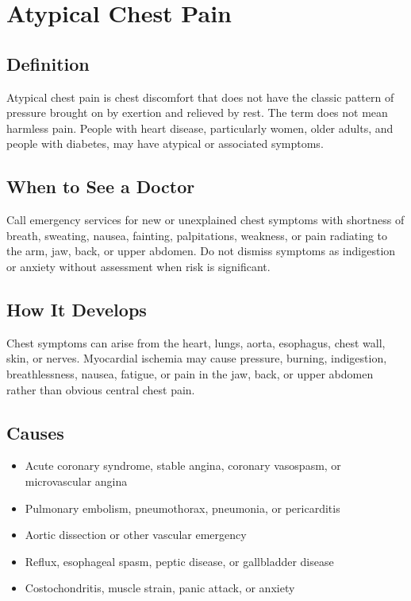 \chapter{Atypical Chest Pain}

\section*{Definition}
Atypical chest pain is chest discomfort that does not have the classic pattern of pressure brought on by exertion and relieved by rest. The term does not mean harmless pain. People with heart disease, particularly women, older adults, and people with diabetes, may have atypical or associated symptoms.

\section*{When to See a Doctor}
Call emergency services for new or unexplained chest symptoms with shortness of breath, sweating, nausea, fainting, palpitations, weakness, or pain radiating to the arm, jaw, back, or upper abdomen. Do not dismiss symptoms as indigestion or anxiety without assessment when risk is significant.

\section*{How It Develops}
Chest symptoms can arise from the heart, lungs, aorta, esophagus, chest wall, skin, or nerves. Myocardial ischemia may cause pressure, burning, indigestion, breathlessness, nausea, fatigue, or pain in the jaw, back, or upper abdomen rather than obvious central chest pain.

\section*{Causes}
\begin{itemize}
  \item Acute coronary syndrome, stable angina, coronary vasospasm, or microvascular angina
  \item Pulmonary embolism, pneumothorax, pneumonia, or pericarditis
  \item Aortic dissection or other vascular emergency
  \item Reflux, esophageal spasm, peptic disease, or gallbladder disease
  \item Costochondritis, muscle strain, panic attack, or anxiety
\end{itemize}

